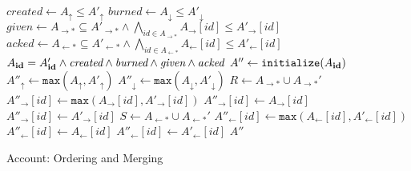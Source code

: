 \documentclass[9pt, oneside]{article}   	%
\begin{document}
\begin{algorithm}
\begin{algorithmic}[1]
     
        \State $\textit{created} \leftarrow A_\uparrow \leq A'_\uparrow$
        \State $\textit{burned} \leftarrow A_\downarrow \leq A'_\downarrow$
        \State $\textit{given} \leftarrow A_{\rightarrow *} \subseteq A'_{\rightarrow *} \wedge \bigwedge\limits_{id \in A_{\rightarrow *}} A_{\rightarrow}[id] \leq A'_{\rightarrow}[id]$ 
        \State $\textit{acked} \leftarrow A_{\leftarrow *} \subseteq A'_{\leftarrow *} \wedge \bigwedge\limits_{id \in A_{\leftarrow *}} A_{\leftarrow}[id] \leq A'_{\leftarrow}[id]$
        \State \Return $A_{\footnotesize \textbf{id}} = A'_{\footnotesize \textbf{id}} \wedge \textit{created} \wedge \textit{burned} \wedge \textit{given} \wedge \textit{acked}$
    \EndFunction
    \State
     
        \State $A'' \leftarrow \texttt{initialize}(A_{\footnotesize \textbf{id}})$ 
        \State $A''_\uparrow \leftarrow \texttt{max}(A_\uparrow, A'_\uparrow)$
        \State $A''_\downarrow \leftarrow \texttt{max}(A_\downarrow, A'_\downarrow)$ 
        \State
        \State $R \leftarrow A_{\rightarrow *} \cup A_{\rightarrow *}'$ 
			\State $A''_{\rightarrow}[id] \leftarrow \texttt{max}(A_{\rightarrow}[id], A'_{\rightarrow}[id])$
			\State $A''_{\rightarrow}[id] \leftarrow A_{\rightarrow}[id]$
		\Else
			\State $A''_{\rightarrow}[id] \leftarrow A'_{\rightarrow}[id]$
		\EndIf
	\EndFor
	\State
	\State $S \leftarrow A_{\leftarrow *} \cup A_{\leftarrow *}'$ 
			\State $A''_{\leftarrow}[id] \leftarrow \texttt{max}(A_{\leftarrow}[id], A'_{\leftarrow}[id])$
			\State $A''_{\leftarrow}[id] \leftarrow A_{\leftarrow}[id]$
		\Else
			\State $A''_{\leftarrow}[id] \leftarrow A'_{\leftarrow}[id]$
		\EndIf
	\EndFor
	\State
	\State \Return $A''$	
    \EndFunction
\end{algorithmic}
\caption{\label{alg:account-ordering} Account: Ordering and Merging}
\end{algorithm}
\end{document}
